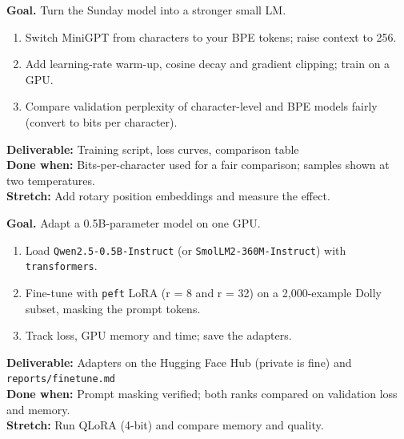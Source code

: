 \begin{tcolorbox}[enhanced,breakable,colback=white,colframe=sun,boxrule=0.8pt,arc=2pt,left=7pt,right=7pt,top=4pt,bottom=4pt,
  title={\bfseries Tuesday --- Scale up MiniGPT\hfill\normalfont\small 3 h},coltitle=white,colbacktitle=sun,fonttitle=\small]
\textbf{Goal.} Turn the Sunday model into a stronger small LM.
\begin{enumerate}[itemsep=1pt,topsep=2pt]
  \item Switch MiniGPT from characters to your BPE tokens; raise context to 256.
  \item Add learning-rate warm-up, cosine decay and gradient clipping; train on a GPU.
  \item Compare validation perplexity of character-level and BPE models fairly (convert to bits per character).
\end{enumerate}
\textbf{\color{dataC}Deliverable:} Training script, loss curves, comparison table\\
\textbf{\color{navy}Done when:} Bits-per-character used for a fair comparison; samples shown at two temperatures.\\
\textbf{\color{skillC}Stretch:} Add rotary position embeddings and measure the effect.
\end{tcolorbox}

\begin{tcolorbox}[enhanced,breakable,colback=white,colframe=sun,boxrule=0.8pt,arc=2pt,left=7pt,right=7pt,top=4pt,bottom=4pt,
  title={\bfseries Wednesday --- LoRA / QLoRA on a real open model\hfill\normalfont\small 3 h},coltitle=white,colbacktitle=sun,fonttitle=\small]
\textbf{Goal.} Adapt a 0.5B-parameter model on one GPU.
\begin{enumerate}[itemsep=1pt,topsep=2pt]
  \item Load \texttt{Qwen2.5-0.5B-Instruct} (or \texttt{SmolLM2-360M-Instruct}) with \texttt{transformers}.
  \item Fine-tune with \texttt{peft} LoRA (r = 8 and r = 32) on a 2,000-example Dolly subset, masking the prompt tokens.
  \item Track loss, GPU memory and time; save the adapters.
\end{enumerate}
\textbf{\color{dataC}Deliverable:} Adapters on the Hugging Face Hub (private is fine) and \texttt{reports/finetune.md}\\
\textbf{\color{navy}Done when:} Prompt masking verified; both ranks compared on validation loss and memory.\\
\textbf{\color{skillC}Stretch:} Run QLoRA (4-bit) and compare memory and quality.
\end{tcolorbox}

